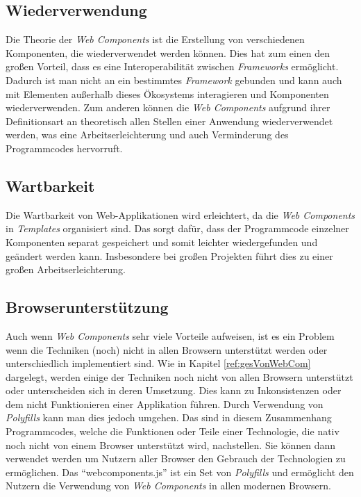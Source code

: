 \documentclass[12pt, paper=a4, bibtotoc, toc=listof, headsepline=true]{scrreprt}
\begin{document}
			\subsection{Wiederverwendung}
			Die Theorie der \emph{Web Components} ist die Erstellung von verschiedenen Komponenten, die wiederverwendet werden können. Dies hat zum einen den großen Vorteil, dass es eine Interoperabilität zwischen \emph{Frameworks} ermöglicht\cite[S.2]{patel2015learning}. Dadurch ist man nicht an ein bestimmtes \emph{Framework} gebunden und kann auch mit Elementen außerhalb dieses Ökosystems interagieren und Komponenten wiederverwenden. Zum anderen können die \emph{Web Components} aufgrund ihrer Definitionsart an theoretisch allen Stellen einer Anwendung wiederverwendet werden, was eine Arbeitserleichterung und auch Verminderung des Programmcodes hervorruft. 
			\subsection{Wartbarkeit}
			Die Wartbarkeit von Web-Applikationen wird erleichtert, da die \emph{Web Components} in \emph{Templates} organisiert sind\cite[S.2]{patel2015learning}. Das sorgt dafür, dass der Programmcode einzelner Komponenten separat gespeichert und somit leichter wiedergefunden und geändert werden kann. Insbesondere bei großen Projekten führt dies zu einer großen Arbeitserleichterung.
			\subsection{Browserunterstützung}
			\label{sec:broUnt}
			Auch wenn \emph{Web Components} sehr viele Vorteile aufweisen, ist es ein Problem wenn die Techniken (noch) nicht in allen Browsern unterstützt werden oder unterschiedlich implementiert sind. Wie in Kapitel \ref{ref:gesVonWebCom} dargelegt, werden einige der Techniken noch nicht von allen Browsern unterstützt oder unterscheiden sich in deren Umsetzung. Dies kann zu Inkonsistenzen oder dem nicht Funktionieren einer Applikation führen. Durch Verwendung von  \emph{Polyfills} kann man dies jedoch umgehen. Das sind in diesem Zusammenhang Programmcodes, welche die Funktionen oder Teile einer Technologie, die nativ noch nicht von einem Browser unterstützt wird, nachstellen. Sie können dann verwendet werden um Nutzern aller Browser den Gebrauch der Technologien zu ermöglichen\cite[S.4]{satrom2014building}. Das \enquote{webcomponents.js} ist ein Set von \emph{Polyfills} und ermöglicht den Nutzern die Verwendung von \emph{Web Components} in allen modernen Browsern\cite{webComJs}.
\end{document}
